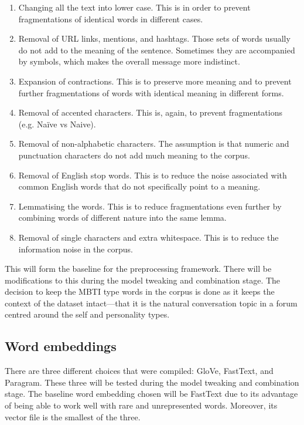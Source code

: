 \documentclass[11pt,a4paper]{article}
\begin{document}
	\begin{enumerate}
		\item Changing all the text into lower case. This is in order to prevent fragmentations of identical words in different cases.
		\item Removal of URL links, mentions, and hashtags. Those sets of words usually do not add to the meaning of the sentence. Sometimes they are accompanied by symbols, which makes the overall message more indistinct.
		\item Expansion of contractions. This is to preserve more meaning and to prevent further fragmentations of words with identical meaning in different forms.
		\item Removal of accented characters. This is, again, to prevent fragmentations (e.g. Naïve vs Naive).
		\item Removal of non-alphabetic characters. The assumption is that numeric and punctuation characters do not add much meaning to the corpus.
		\item Removal of English stop words. This is to reduce the noise associated with common English words that do not specifically point to a meaning.
		\item Lemmatising the words. This is to reduce fragmentations even further by combining words of different nature into the same lemma.
		\item Removal of single characters and extra whitespace. This is to reduce the information noise in the corpus.
	\end{enumerate}

	This will form the baseline for the preprocessing framework. There will be modifications to this during the model tweaking and combination stage. The decision to keep the MBTI type words in the corpus is done as it keeps the context of the dataset intact---that it is the natural conversation topic in a forum centred around the self and personality types.
	
	\subsection{Word embeddings}
	
	There are three different choices that were compiled: GloVe, FastText, and Paragram.\autocites{GloVeGlobalVectors}{EnglishWordVectors}{JohnWieting} These three will be tested during the model tweaking and combination stage. The baseline word embedding chosen will be FastText due to its advantage of being able to work well with rare and unrepresented words.\autocite{GloVeFastTextTwo} Moreover, its vector file is the smallest of the three.
	
\end{document}
